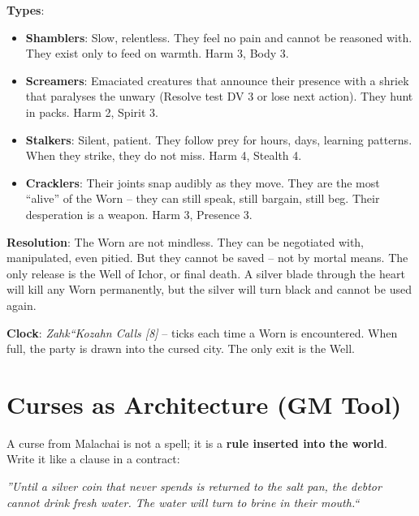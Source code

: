 \noindent\textbf{Types}:
\begin{itemize}
    \item \textbf{Shamblers}: Slow, relentless. They feel no pain and cannot be reasoned with. They exist only to feed on warmth. Harm 3, Body 3.
    \item \textbf{Screamers}: Emaciated creatures that announce their presence with a shriek that paralyses the unwary (Resolve test DV 3 or lose next action). They hunt in packs. Harm 2, Spirit 3.
    \item \textbf{Stalkers}: Silent, patient. They follow prey for hours, days, learning patterns. When they strike, they do not miss. Harm 4, Stealth 4.
    \item \textbf{Cracklers}: Their joints snap audibly as they move. They are the most ``alive'' of the Worn -- they can still speak, still bargain, still beg. Their desperation is a weapon. Harm 3, Presence 3.
\end{itemize}

\noindent\textbf{Resolution}: The Worn are not mindless. They can be negotiated with, manipulated, even pitied. But they cannot be saved -- not by mortal means. The only release is the Well of Ichor, or final death. A silver blade through the heart will kill any Worn permanently, but the silver will turn black and cannot be used again.

\noindent\textbf{Clock}: \emph{Zahk``Kozahn Calls [8]} -- ticks each time a Worn is encountered. When full, the party is drawn into the cursed city. The only exit is the Well.


\section*{Curses as Architecture (GM Tool)}

\noindent A curse from Malachai is not a spell; it is a \textbf{rule inserted into the world}. Write it like a clause in a contract:

\emph{''Until a silver coin that never spends is returned to the salt pan, the debtor cannot drink fresh water. The water will turn to brine in their mouth.``}

